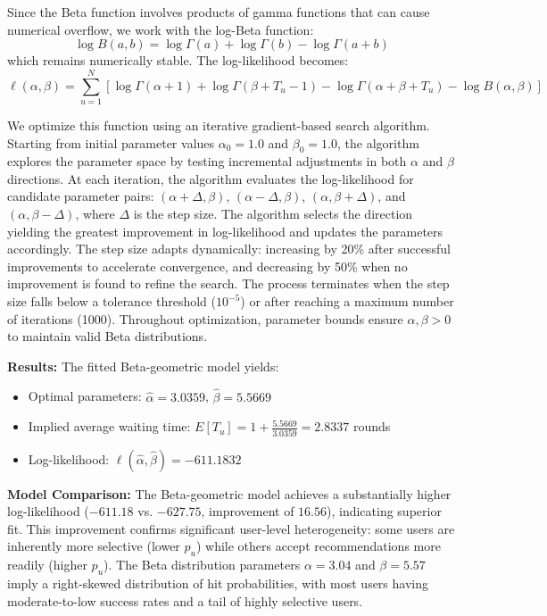 \documentclass[12pt,a4paper]{article}
\begin{document}
Since the Beta function involves products of gamma functions that can cause numerical overflow, we work with the log-Beta function:
\begin{equation}
\log B(a, b) = \log \Gamma(a) + \log \Gamma(b) - \log \Gamma(a+b)
\end{equation}
which remains numerically stable. The log-likelihood becomes:
\begin{equation}
\ell(\alpha, \beta) = \sum_{u=1}^{N} \left[ \log \Gamma(\alpha + 1) + \log \Gamma(\beta + T_u - 1) - \log \Gamma(\alpha + \beta + T_u) - \log B(\alpha, \beta) \right]
\end{equation}

We optimize this function using an iterative gradient-based search algorithm. Starting from initial parameter values $\alpha_0 = 1.0$ and $\beta_0 = 1.0$, the algorithm explores the parameter space by testing incremental adjustments in both $\alpha$ and $\beta$ directions. At each iteration, the algorithm evaluates the log-likelihood for candidate parameter pairs: $(\alpha + \Delta, \beta)$, $(\alpha - \Delta, \beta)$, $(\alpha, \beta + \Delta)$, and $(\alpha, \beta - \Delta)$, where $\Delta$ is the step size. The algorithm selects the direction yielding the greatest improvement in log-likelihood and updates the parameters accordingly. The step size adapts dynamically: increasing by 20\% after successful improvements to accelerate convergence, and decreasing by 50\% when no improvement is found to refine the search. The process terminates when the step size falls below a tolerance threshold ($10^{-5}$) or after reaching a maximum number of iterations (1000). Throughout optimization, parameter bounds ensure $\alpha, \beta > 0$ to maintain valid Beta distributions.

\textbf{Results:} The fitted Beta-geometric model yields:
\begin{itemize}
    \item Optimal parameters: $\hat{\alpha} = 3.0359$, $\hat{\beta} = 5.5669$
    \item Implied average waiting time: $E[T_u] = 1 + \frac{5.5669}{3.0359} = 2.8337$ rounds
    \item Log-likelihood: $\ell(\hat{\alpha}, \hat{\beta}) = -611.1832$
\end{itemize}

\textbf{Model Comparison:} The Beta-geometric model achieves a substantially higher log-likelihood ($-611.18$ vs. $-627.75$, improvement of $16.56$), indicating superior fit. This improvement confirms significant user-level heterogeneity: some users are inherently more selective (lower $p_u$) while others accept recommendations more readily (higher $p_u$). The Beta distribution parameters $\alpha = 3.04$ and $\beta = 5.57$ imply a right-skewed distribution of hit probabilities, with most users having moderate-to-low success rates and a tail of highly selective users.
\end{document}
